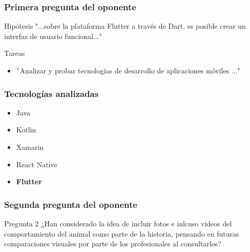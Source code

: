 \documentclass[14pt]{beamer}
\begin{document}
\begin{frame}
\frametitle{Primera pregunta del oponente}
\begin{block}{Hipótesis}
"...sobre la plataforma Flutter a través de Dart, es posible crear un interfaz de usuario funcional..."
\end{block}

\begin{alertblock}{Tareas}
\begin{itemize}
\item ''Analizar y probar tecnologías de desarrollo de aplicaciones móviles ..."
\end{itemize}

\end{alertblock}
\end{frame}

\begin{frame}
\frametitle{Tecnologías analizadas}
\begin{itemize}
\item Java
\item Kotlin
\item Xamarin
\item React Native
\item \textbf{Flutter}

\end{itemize}

\end{frame}


\begin{frame}
\frametitle{Segunda pregunta del oponente}
\begin{block}{Pregunta 2}
¿Han considerado la idea de incluir fotos e inlcuso videos del comportamiento del animal como parte de la historia, pensando en futuras comparaciones visuales por parte de los profesionales al consultarlos?
\end{block}
\end{frame}
\end{document}
